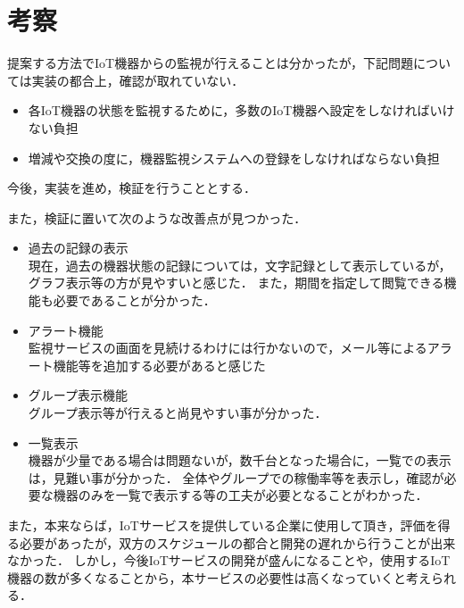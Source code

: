 \section{考察}
提案する方法でIoT機器からの監視が行えることは分かったが，下記問題については実装の都合上，確認が取れていない．
\begin{itemize}
\item 各IoT機器の状態を監視するために，多数のIoT機器へ設定をしなければいけない負担
\item 増減や交換の度に，機器監視システムへの登録をしなければならない負担
\end{itemize}
今後，実装を進め，検証を行うこととする．

また，検証に置いて次のような改善点が見つかった．
\begin{itemize}
\item 過去の記録の表示\\
	現在，過去の機器状態の記録については，文字記録として表示しているが，グラフ表示等の方が見やすいと感じた．
	また，期間を指定して閲覧できる機能も必要であることが分かった．
\item アラート機能\\
	監視サービスの画面を見続けるわけには行かないので，メール等によるアラート機能等を追加する必要があると感じた
\item グループ表示機能\\
	グループ表示等が行えると尚見やすい事が分かった．
\item 一覧表示\\
	機器が少量である場合は問題ないが，数千台となった場合に，一覧での表示は，見難い事が分かった．
	全体やグループでの稼働率等を表示し，確認が必要な機器のみを一覧で表示する等の工夫が必要となることがわかった．
\end{itemize}
また，本来ならば，IoTサービスを提供している企業に使用して頂き，評価を得る必要があったが，双方のスケジュールの都合と開発の遅れから行うことが出来なかった．
しかし，今後IoTサービスの開発が盛んになることや，使用するIoT機器の数が多くなることから，本サービスの必要性は高くなっていくと考えられる．

